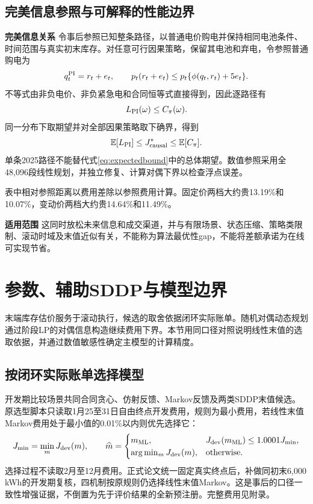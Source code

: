 \documentclass[UTF8,a4paper,zihao=-4,fontset=mac]{ctexart}
\newcommand{\E}{\mathbb E}
\newcommand{\scope}{\par\noindent\textbf{适用范围}\quad}
\begin{document}
\subsection{完美信息参照与可解释的性能边界}
\noindent\textbf{完美信息关系}\quad
令事后参照已知整条路径，以普通电价购电并保持相同电池条件、时间范围与真实初末库存。对任意可行因果策略，保留其电池和弃电，令参照普通购电为
\begin{equation}\label{eq:oracle}
 q_t^{\rm PI}=r_t+e_t,\qquad
 p_t(r_t+e_t)\le p_t\{\phi(q_t,r_t)+5e_t\}.
\end{equation}
不等式由非负电价、非负紧急电和合同恒等式直接得到，因此逐路径有
\begin{equation}\label{eq:pathbound}
 L_{\rm PI}(\omega)\le C_\pi(\omega).
\end{equation}
同一分布下取期望并对全部因果策略取下确界，得到
\begin{equation}\label{eq:expectedbound}
 \E[L_{\rm PI}]\le J_{\rm causal}^*\le\E[C_\pi].
\end{equation}
单条2025路径不能替代式\eqref{eq:expectedbound}中的总体期望。数值参照采用全48,096段线性规划，并独立修复、计算对偶下界以检查浮点误差。

表中相对参照距离以费用差除以参照费用计算。固定价两档大约贵13.19\%和10.07\%，变动价两档大约贵14.64\%和11.49\%。\scope
这同时放松未来信息和成交渠道，并与有限场景、状态压缩、策略类限制、滚动时域及末值近似有关，不能称为算法最优性gap，不能将差额承诺为在线可实现节省。

\section{参数、辅助SDDP与模型边界}
末端库存估价服务于滚动执行，候选的取舍依据闭环实际账单。随机对偶动态规划通过阶段LP的对偶信息构造继续费用下界\cite{pereira,bhattacharya2018}。本节用同口径对照说明线性末值的选取依据，并通过数值敏感性确定主模型的计算精度。

\subsection{按闭环实际账单选择模型}
开发期比较场景共同合同贪心、仿射反馈、Markov反馈及两类SDDP末值候选。原选型脚本只读取1月25至31日自由终点开发费用，规则为最小费用，若线性末值Markov费用处于最小值的0.01\%以内则优先选择它：
\begin{equation}\label{eq:selection}
 J_{\min}=\min_mJ_{\rm dev}(m),\qquad
 \widehat m=\begin{cases}m_{\rm ML},&J_{\rm dev}(m_{\rm ML})\le1.0001J_{\min},\\
 \arg\min_mJ_{\rm dev}(m),&\text{otherwise}.
 \end{cases}
\end{equation}
选择过程不读取2月至12月费用。正式论文统一固定真实终点后，补做同初末6,000 kWh的开发期复核，四机制按原规则仍选择线性末值Markov。这是事后的口径一致性增强证据，不倒置为先于评价结果的全新预注册。完整费用见附录。
\end{document}
